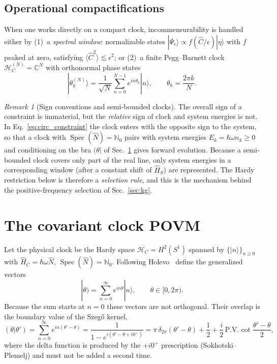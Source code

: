 \documentclass[aps,prd,onecolumn,notitlepage,10pt,amsmath,amssymb,amsfonts,nofootinbib]{revtex4-2}
\theoremstyle{definition}
\theoremstyle{remark}
\newtheorem{remark}{Remark}
\newcommand{\Hil}{\mathcal{H}}
\newcommand{\Hs}{\widehat{H}_S}
\newcommand{\Nop}{\widehat{N}}
\newcommand{\Cop}{\widehat{C}}
\newcommand{\N}{\mathbb{N}}
\newcommand{\C}{\mathbb{C}}
\newcommand{\Spec}{\operatorname{Spec}}
\newcommand{\pket}[1]{|#1)}
\newcommand{\pbra}[1]{(#1|}
\begin{document}
\subsection{Operational compactifications}
When one works directly on a compact clock, incommensurability is handled either by (1)~a \emph{spectral window}: normalizable states $|\Psi_\epsilon\rangle\propto f(\Cop/\epsilon)|\eta\rangle$ with $f$ peaked at zero, satisfying $\langle\Cop^2\rangle\lesssim\epsilon^2$; or (2)~a finite Pegg--Barnett clock~\cite{PeggBarnett1989} $\Hil_C^{(N)}=\C^N$ with orthonormal phase states
\begin{equation}
  |\theta_k^{(N)}\rangle=\frac{1}{\sqrt N}\sum_{n=0}^{N-1}e^{in\theta_k}|n\rangle,\qquad \theta_k=\frac{2\pi k}{N}.
  \label{eq:pb}
\end{equation}

\begin{remark}[Sign conventions and semi-bounded clocks]
\label{rem:signs}
The overall sign of a constraint is immaterial, but the \emph{relative} sign of clock and system energies is not. In Eq.~\eqref{eq:circ_constraint} the clock enters with the opposite sign to the system, so that a clock with $\Spec(\Nop)=\N_0$ pairs with system energies $E_k=\hbar\omega n_k\ge0$ and conditioning on the bra $\pbra{\theta}$ of Sec.~\ref{sec:povm} gives forward evolution. Because a semi-bounded clock covers only part of the real line, only system energies in a corresponding window (after a constant shift of $\Hs$) are represented. The Hardy restriction below is therefore a \emph{selection rule}, and this is the mechanism behind the positive-frequency selection of Sec.~\ref{sec:kg}.
\end{remark}

\section{The covariant clock POVM}
\label{sec:povm}

Let the physical clock be the Hardy space $\Hil_C=H^2(S^1)$ spanned by $\{|n\rangle\}_{n\ge0}$ with $\widehat H_C=\hbar\omega\Nop$, $\Spec(\Nop)=\N_0$. Following Holevo~\cite{Holevo1982} define the generalized vectors
\begin{equation}
  \pket{\theta}=\sum_{n=0}^{\infty}e^{in\theta}|n\rangle,\qquad\theta\in[0,2\pi).
  \label{eq:holevo}
\end{equation}
Because the sum starts at $n=0$ these vectors are not orthogonal. Their overlap is the boundary value of the Szeg\H{o} kernel,
\begin{equation}
  \pbra{\theta}\theta')=\sum_{n=0}^\infty e^{in(\theta'-\theta)}=\frac{1}{1-e^{i(\theta'-\theta+i0^+)}}
  =\pi\,\delta_{2\pi}(\theta'-\theta)+\frac12+\frac i2\,\mathrm{P.V.}\cot\frac{\theta'-\theta}{2},
  \label{eq:szego}
\end{equation}
where the delta function is produced by the $+i0^+$ prescription (Sokhotski--Plemelj) and must not be added a second time.
\end{document}
